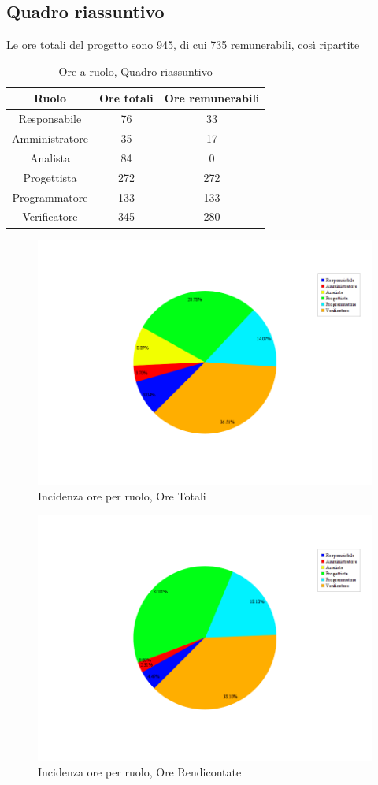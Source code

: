 \subsection{Quadro riassuntivo}
Le ore totali del progetto sono 945, di cui 735 remunerabili, così ripartite
\begin{table}[H]
	\begin{center}
		\begin{tabular}{|c|c|c|}
			\hline
			\textbf{Ruolo}	& \textbf{Ore totali} & \textbf{Ore remunerabili} \\
			\hline
			Responsabile	&	76	&	33	\\
			\hline
			Amministratore	&	35	&	17	\\
			\hline
			Analista		&	84	&	0	\\
			\hline
			Progettista		&	272	&	272	\\
			\hline
			Programmatore	&	133	&	133	\\
			\hline
			Verificatore	&	345	&	280	\\
			\hline
		\end{tabular}
	\end{center}
	\caption{Ore a ruolo, Quadro riassuntivo}
\end{table}

\begin{figure}[H]
	\centering
	\includegraphics[scale=0.3]{immagini/Grafi/OreRuoloOreTotali}
	\caption{Incidenza ore per ruolo, Ore Totali}
\end{figure}

\begin{figure}[H]
	\centering
	\includegraphics[scale=0.3]{immagini/Grafi/OreRuoloRendicontabili}
	\caption{Incidenza ore per ruolo, Ore Rendicontate}
\end{figure}
